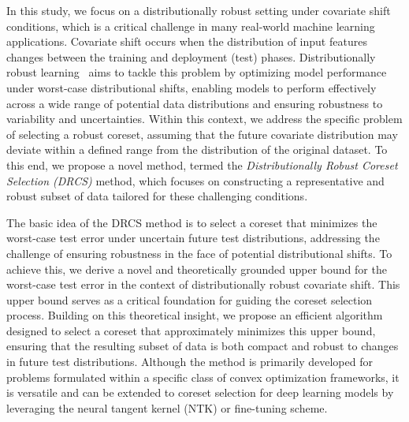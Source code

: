In this study, we focus on a distributionally robust setting under covariate shift conditions, which is a critical challenge in many real-world machine learning applications.
%
Covariate shift occurs when the distribution of input features changes between the training and deployment (test) phases.
%
Distributionally robust learning~\citep{goh2010distributionally, delage2010distributionally, chen2021distributionally} aims to tackle this problem by optimizing model performance under worst-case distributional shifts, enabling models to perform effectively across a wide range of potential data distributions and ensuring robustness to variability and uncertainties.
%
Within this context, we address the specific problem of selecting a robust coreset, assuming that the future covariate distribution may deviate within a defined range from the distribution of the original dataset.
%
To this end, we propose a novel method, termed the \emph{Distributionally Robust Coreset Selection (DRCS)} method, which focuses on constructing a representative and robust subset of data tailored for these challenging conditions.

The basic idea of the DRCS method is to select a coreset that minimizes the worst-case test error under uncertain future test distributions, addressing the challenge of ensuring robustness in the face of potential distributional shifts.
%
To achieve this, we derive a novel and theoretically grounded upper bound for the worst-case test error in the context of distributionally robust covariate shift.
%
This upper bound serves as a critical foundation for guiding the coreset selection process.
%
Building on this theoretical insight, we propose an efficient algorithm designed to select a coreset that approximately minimizes this upper bound, ensuring that the resulting subset of data is both compact and robust to changes in future test distributions.
%
Although the method is primarily developed for problems formulated within a specific class of convex optimization frameworks, it is versatile and can be extended to coreset selection for deep learning models by leveraging the neural tangent kernel (NTK) or fine-tuning scheme.

